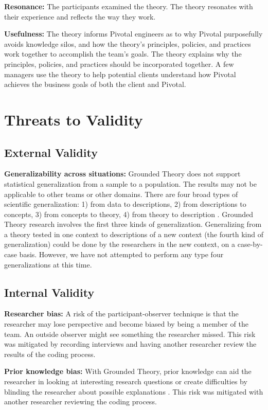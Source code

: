 \textbf{Resonance:} The participants examined the theory. The theory resonates with their experience and reflects the way they work.

\textbf{Usefulness:} The theory informs Pivotal engineers as to why Pivotal purposefully avoids knowledge silos, and how the theory's principles, policies, and practices work together to accomplish the team's goals. The theory explains why the principles, policies, and practices should be incorporated together. A few managers use  the theory to help potential clients understand how Pivotal achieves the business goals of both the client and Pivotal.

\section{Threats to Validity}

\subsection{External Validity}

\textbf{Generalizability across situations:} Grounded Theory does not support statistical generalization from a sample to a population. The results may not be applicable to other teams or other domains. There are four broad types of scientific generalization: 1) from data to descriptions, 2) from descriptions to concepts, 3) from concepts to theory, 4) from theory to description \cite{Lee2003generalizing}. Grounded Theory research involves the first three kinds of generalization. Generalizing from a theory tested in one context to descriptions of a new context (the fourth kind of generalization) could be done by the researchers in the new context, on a case-by-case basis. However, we have not attempted to perform any type four generalizations at this time.

\subsection{Internal Validity}
\textbf{Researcher bias:} A risk of the participant-observer technique is that the researcher may lose perspective and become biased by being a member of the team. An outside observer might see something the researcher missed. This risk was mitigated by recording interviews and having another researcher review the results of the coding process.

\textbf{Prior knowledge bias:} With Grounded Theory, prior knowledge can aid the researcher in looking at interesting research questions or create difficulties by blinding the researcher about possible explanations \cite{GlaserIssues}. This risk was mitigated with another researcher reviewing the coding process. 

